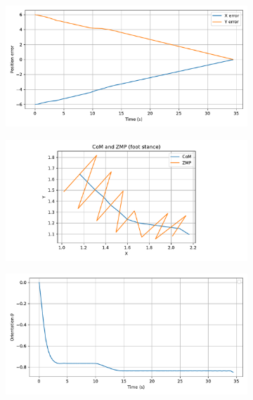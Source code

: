 \begin{figure}[H]
    \centering
    \begin{subfigure}{0.45\linewidth}
        \centering
        \includegraphics[width=\linewidth]{figures/Simulations/sim1circles/evolution_0.pdf}
    \end{subfigure}
    \begin{subfigure}{0.45\linewidth}
        \centering
        \includegraphics[width=\linewidth]{figures/Simulations/sim1circles/evolution_5.pdf}
    \end{subfigure}
    \hfill
    \begin{subfigure}{0.45\linewidth}
        \centering
        \includegraphics[width=\linewidth]{figures/Simulations/sim1circles/evolution_2.pdf}

\end{subfigure}
\end{figure}
